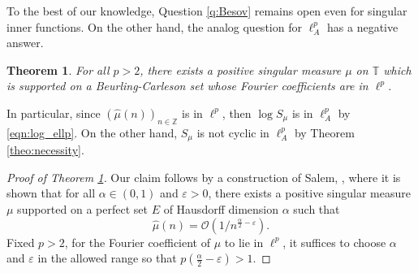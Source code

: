 \documentclass{birkjour}
\numberwithin{equation}{section}
\theoremstyle{plain}
\newtheorem{theo}{Theorem}[section]
\theoremstyle{definition}
\newcommand{\T}{\mathbb{T}}
\newcommand{\Z}{\mathbb{Z}}
\newcommand{\1}{\mathds{1}}
\begin{document}
To the best of our knowledge, Question \ref{q:Besov} remains open even for singular inner functions. On the other hand, the analog question for $\ell^p_A$ has a negative answer. 

\begin{theo}
\label{theo:log_notcyclic}
For all $p>2$, there exists a positive singular measure $\mu$ on $\T$ which is supported on a Beurling-Carleson set whose Fourier coefficients are in $\ell^p$. 
\end{theo}
In particular, since $(\hat{\mu}(n))_{n\in\Z}$ is in $\ell^p$, then $\log S_\mu$ is in $\ell^p_A$ by \eqref{eqn:log_ellp}. On the other hand, $S_\mu$ is not cyclic in $\ell^p_A$ by Theorem \ref{theo:necessity}.
\begin{proof}[Proof of Theorem \ref{theo:log_notcyclic}]
Our claim follows by a construction of Salem, \cite[Th. II]{Salem51}, where it is shown that for all $\alpha\in (0, 1)$ and $\varepsilon>0$, there exists a positive singular measure $\mu$ supported on a perfect set $E$ of Hausdorff dimension $\alpha$ such that 
\begin{equation}
\label{eqn:fourier_bigo}
\hat{\mu}(n)=\mathcal{O}(1/n^{\frac{\alpha}{2}-\varepsilon}).
\end{equation}
Fixed $p>2$, for the Fourier coefficient of $\mu$ to lie in $\ell^p$, it suffices to choose $\alpha$ and $\varepsilon$ in the allowed range so that $p\left(\frac{\alpha}{2}-\varepsilon\right)>1$.


\end{proof}
\end{document}
